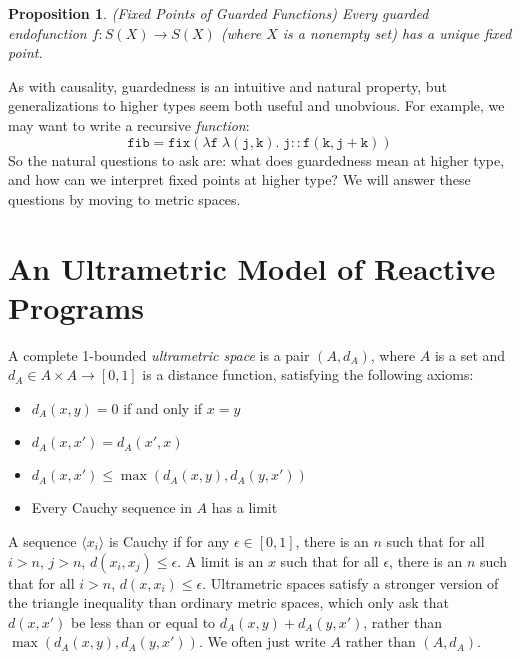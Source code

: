 \documentclass[nocopyrightspace,preprint]{sigplanconf}
\newcommand{\term}[1]{\ensuremath{\mathtt{{#1}}}}
\newtheorem{prop}{Proposition}
\begin{document}
\begin{prop}{(Fixed Points of Guarded Functions)}
Every guarded endofunction $f : S(X) \to S(X)$ (where $X$ is a
nonempty set) has a unique fixed point.
\end{prop}

As with causality, guardedness is an intuitive and natural property,
but generalizations to higher types seem both useful and unobvious. For
example, we may want to write a recursive \emph{function}:
\begin{displaymath}
\term{fib = fix(\lambda f\; \lambda (j,k).\; j :: f(k,j+k))}
\end{displaymath}
So the natural questions to ask are: what does guardedness mean at
higher type, and how can we interpret fixed points at higher type?
We will answer these questions by moving to metric spaces.

\section{An Ultrametric Model of Reactive Programs}


A complete 1-bounded \emph{ultrametric space} is a pair $(A, d_A)$,
where $A$ is a set and $d_A \in A \times A \to [0,1]$ is a distance
function, satisfying the following axioms:
\begin{itemize}
\item $d_A(x, y) = 0$ if and only if $x = y$
\item $d_A(x, x') = d_A(x', x)$
\item $d_A(x, x') \leq \max(d_A(x, y), d_A(y, x'))$
\item Every Cauchy sequence in $A$ has a limit
\end{itemize}
A sequence $\langle x_i\rangle$ is Cauchy if for any $\epsilon\in[0,1]$, there is an $n$ such that for all $i>n$, $j>n$, $d(x_i,x_j)\leq \epsilon$. A limit is an $x$ such that for all $\epsilon$, there is an $n$ such that for all $i>n$, $d(x,x_i)\leq \epsilon$. 
Ultrametric spaces satisfy a stronger version of the triangle inequality than
ordinary metric spaces, which only ask that
$d(x,x')$ be less than or equal to $d_A(x, y) + d_A(y, x')$,
rather than $\max(d_A(x, y), d_A(y, x'))$.
We often just write $A$ rather than $(A, d_A)$. 
\end{document}
